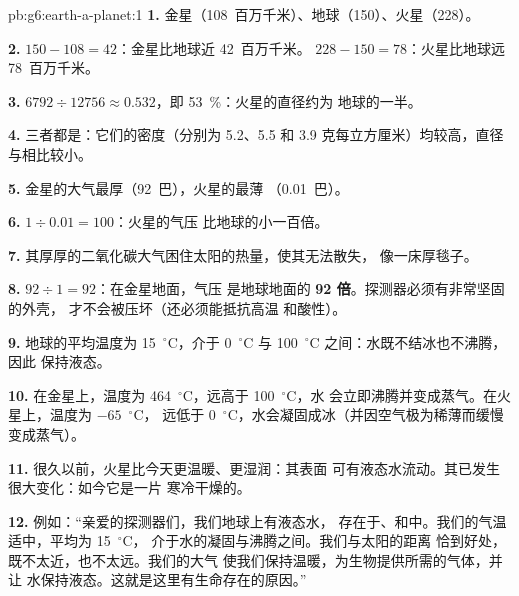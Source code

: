 \begin{solution}{pb:g6:earth-a-planet:1}
\textbf{1.} 金星（108~百万千米）、地球（150）、火星（228）。

\textbf{2.} $150 - 108 = 42$：金星比地球近 42~百万千米。
$228 - 150 = 78$：火星比地球远 78~百万千米。

\textbf{3.} $6792 \div 12756 \approx 0.532$，即 53~\%：火星的直径约为
地球的一半。

\textbf{4.} 三者都是：它们的密度（分别为 5.2、5.5 和 3.9
克每立方厘米）均较高，直径
与相比较小。

\textbf{5.} 金星的大气最厚（92~巴），火星的最薄
（0.01~巴）。

\textbf{6.} $1 \div 0.01 = 100$：火星的气压
比地球的小一百倍。

\textbf{7.} 其厚厚的二氧化碳大气困住太阳的热量，使其无法散失，
像一床厚毯子。

\textbf{8.} $92 \div 1 = 92$：在金星地面，气压
是地球地面的 \textbf{92 倍}。探测器必须有非常坚固的外壳，
才不会被压坏（还必须能抵抗高温
和酸性）。

\textbf{9.} 地球的平均温度为 15~$^\circ$C，介于
0~$^\circ$C 与 100~$^\circ$C 之间：水既不结冰也不沸腾，因此
保持液态。

\textbf{10.} 在金星上，温度为 464~$^\circ$C，远高于 100~$^\circ$C，水
会立即沸腾并变成蒸气。在火星上，温度为 $-65$~$^\circ$C，
远低于 0~$^\circ$C，水会凝固成冰（并因空气极为稀薄而缓慢
变成蒸气）。

\textbf{11.} 很久以前，火星比今天更温暖、更湿润：其表面
可有液态水流动。其已发生很大变化：如今它是一片
寒冷干燥的。

\textbf{12.} 例如：“亲爱的探测器们，我们地球上有液态水，
存在于、和中。我们的气温适中，平均为 15~$^\circ$C，
介于水的凝固与沸腾之间。我们与太阳的距离
恰到好处，既不太近，也不太远。我们的大气
使我们保持温暖，为生物提供所需的气体，并让
水保持液态。这就是这里有生命存在的原因。”
\end{solution}
